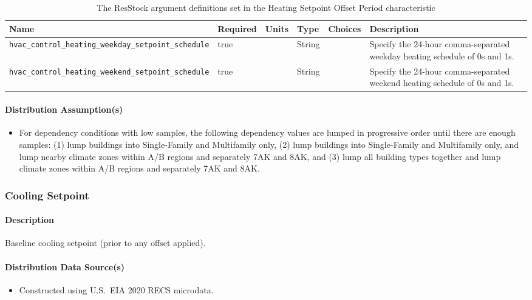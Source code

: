 \begin{longtable}[]{ |p{}|p{1.5cm}|p{1cm}|p{1.1cm}|p{1.4cm}|p{6cm}| }
\caption{The ResStock argument definitions set in the Heating Setpoint Offset Period characteristic} \label{table:hc_arg_def_ht_stp_per} \\
\toprule\noalign{}
Name & Required & Units & Type & Choices & Description \\
\midrule\noalign{}
\endhead
\bottomrule\noalign{}
\endlastfoot
\texttt{hvac\_control\_heating\_weekday\_setpoint\_schedule} & true & &
String & & Specify the 24-hour comma-separated weekday heating schedule
of 0s and 1s. \\
\hline
\texttt{hvac\_control\_heating\_weekend\_setpoint\_schedule} & true & &
String & & Specify the 24-hour comma-separated weekend heating schedule
of 0s and 1s. \\
\end{longtable}

\paragraph{Distribution Assumption(s)}
\begin{itemize}
    \item For dependency conditions with low samples, the following dependency values are lumped in progressive order until there are enough samples: (1) lump buildings into Single-Family and Multifamily only, (2) lump buildings into Single-Family and Multifamily only, and lump nearby climate zones within A/B regions and separately 7AK and 8AK, and (3) lump all building types together and lump climate zones within A/B regions and separately 7AK and 8AK.
\end{itemize}

\subsubsection{Cooling Setpoint}
\paragraph{Description}
Baseline cooling setpoint (prior to any offset applied).

\paragraph{Distribution Data Source(s)}
\begin{itemize}
    \item Constructed using U.S.~EIA 2020 RECS microdata.
\end{itemize}

